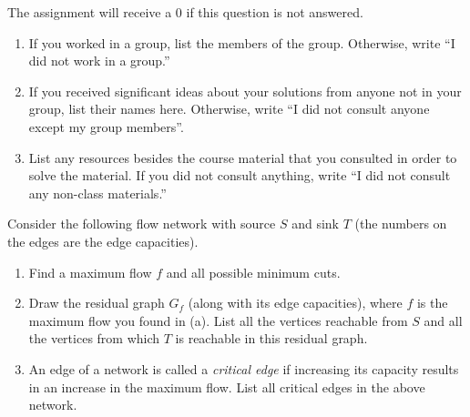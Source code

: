 \documentclass[11pt]{article}
\newcommand{\Arc}[3]{\draw [arc] (#1) to node [auto] {#3} (#2);}
\begin{document}
\begin{qunlist}
\setcounter{sparectr}{-1}

	The assignment will receive a 0 if this question is not answered.
\begin{enumerate}
	\item If you worked in a group, list the members of the group. Otherwise, write ``I did not work in a group.''
	\item If you received significant ideas about your solutions from anyone not in your group, list their names here. Otherwise, write ``I did not consult  anyone except my group members''.
	\item List any resources besides the course material that you consulted in order to solve the material. If you did not consult anything, write ``I did not consult any non-class materials.''
\end{enumerate}

Consider the following flow network with source $S$ and sink $T$ (the numbers on the edges are the edge capacities).


\begin{enumerate}[label=(\alph*)]
\item Find a maximum flow $f$ and all possible minimum cuts.
\item Draw the residual graph $G_f$ (along with its edge capacities), where $f$ is the maximum flow you found in (a). List all the vertices reachable from $S$ and all the vertices from which $T$ is reachable in this residual graph.
\item An edge of a network is called a \emph{critical edge} if increasing its capacity results in an increase in the maximum flow. List all critical edges in the above network.
\end{enumerate}


\end{qunlist}
\end{document}
